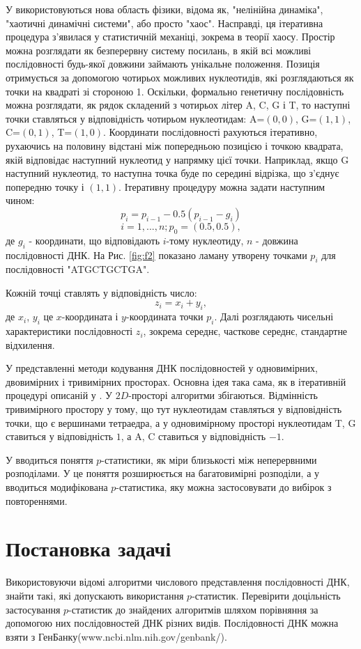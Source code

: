 \documentclass[14pt,a4paper,titlepage]{extarticle}
\begin{document}
У \cite{l3} використовуються нова область фізики, відома як, "нелінійна
динаміка", "хаотичні динамічні системи", або просто "хаос". Насправді, ця
ітеративна процедура з’явилася у статистичній механіці, зокрема в теорії хаосу.
Простір можна розглядати як безперервну систему посилань, в якій всі можливі
послідовності будь-якої довжини займають унікальне положення. Позиція
отримується за допомогою чотирьох можливих нуклеотидів, які розглядаються як
точки на квадраті зі стороною 1. Оскільки, формально генетичну послідовність
можна розглядати, як рядок складений з чотирьох літер A, C, G і T, то наступні
точки ставляться у відповідність чотирьом нуклеотидам: A=$(0,0)$, G=$(1,1)$,
C=$(0,1)$, T=$(1,0)$. Координати послідовності рахуються ітеративно, рухаючись
на половину відстані між попередньою позицією і точкою квадрата, якій
відповідає наступний нуклеотид у напрямку цієї точки. Наприклад, якщо G
наступний нуклеотид, то наступна точка буде по середині відрізка, що з’єднує
попередню точку і $(1,1)$. Ітеративну процедуру можна задати наступним чином:
\[p_i = p_{i-1}-0.5(p_{i-1}-g_i)\]
\[i=1,...,n; p_0=(0.5,0.5),\]
де $g_i$ - координати, що відповідають $i$-тому нуклеотиду, $n$ - довжина послідовності ДНК. На Рис. \ref{fig:f2} показано ламану утворену точками $p_i$ для послідовності "ATGCTGCTGA".\par
Кожній точці ставлять у відповідність число:
\[z_i = x_i + y_i,\]
де $x_i$, $y_i$ це $x$-координата і $y$-координата точки $p_i$. Далі розглядають чисельні характеристики послідовності $z_i$, зокрема середнє, часткове середнє, стандартне відхилення.

У \cite{l4} представленні методи кодування ДНК послідовностей у одновимірних,
двовимірних і тривимірних просторах. Основна ідея така сама, як в ітеративній
процедурі описаній у \cite{l3}. У $2D$-просторі алгоритми збігаються.
Відмінність тривимірного простору у тому, що тут нуклеотидам ставляться у
відповідність точки, що є вершинами тетраедра, а у одновимірному просторі
нуклеотидам T, G ставиться у відповідність $1$, а A, C ставиться у відповідність
$-1$.

У \cite{l5} вводиться поняття $p$-статистики, як міри близькості між
неперервними розподілами. У \cite{l6} це поняття розширюється на багатовимірні
розподіли, а у \cite{l7} вводиться модифікована $p$-статистика, яку можна
застосовувати до вибірок з повтореннями.

\newpage
\section{Постановка задачі}
Використовуючи відомі алгоритми числового представлення послідовності ДНК, знайти такі, які допускають використання $p$-статистик. Перевірити доцільність застосування $p$-статистик до знайдених алгоритмів шляхом порівняння за допомогою них послідовностей ДНК різних видів. Послідовності ДНК можна взяти з ГенБанку(www.ncbi.nlm.nih.gov/genbank/).
\end{document}
